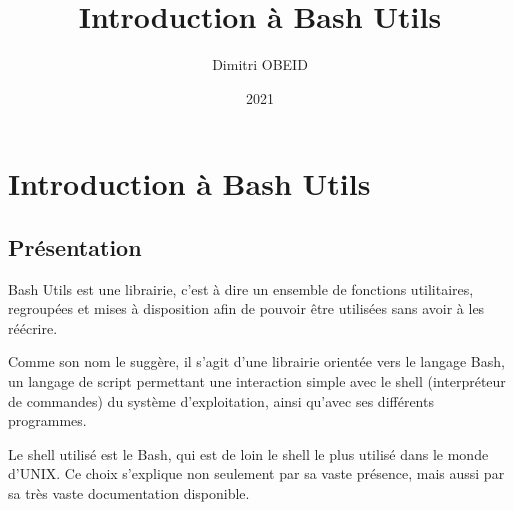 \documentclass[a4paper,10pt]{article}
\title{\color{red}Introduction à Bash Utils}\color{white}
\author{Dimitri OBEID}
\date{2021}
\begin{document}
\maketitle
\newpage

\hypertarget{contents}{}
\tableofcontents
\newpage

\color{red}
\section{Introduction à Bash Utils}\color{white}

\color{green}
\subsection{Présentation}\color{white}
Bash Utils est une librairie, c'est à dire un ensemble de fonctions utilitaires, regroupées et mises à disposition afin de pouvoir être utilisées sans avoir à les réécrire.\linebreak

Comme son nom le suggère, il s'agit d'une librairie orientée vers le langage Bash, un langage de script permettant une interaction simple avec le shell (interpréteur de commandes) du système d'exploitation, ainsi qu'avec ses différents programmes.\linebreak

Le shell utilisé est le Bash, qui est de loin le shell le plus utilisé dans le monde d'UNIX. Ce choix s'explique non seulement par sa vaste présence, mais aussi par sa très vaste documentation disponible.

\color{green}
\end{document}
